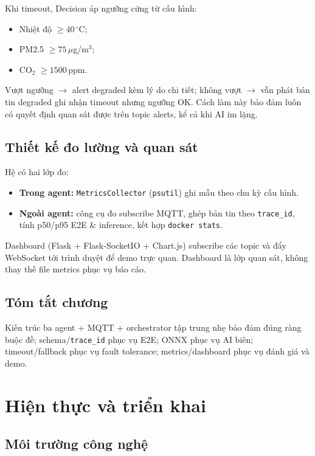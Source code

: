 \documentclass[12pt,a4paper,oneside]{report}
\newcommand{\code}[1]{\texttt{#1}}
\begin{document}
Khi timeout, Decision áp ngưỡng cứng từ cấu hình:
\begin{itemize}
  \item Nhiệt độ $\geq 40\,^\circ$C;
  \item PM2.5 $\geq 75\,\mu$g/m$^3$;
  \item CO$_2$ $\geq 1500$\,ppm.
\end{itemize}
Vượt ngưỡng $\rightarrow$ alert degraded kèm lý do chi tiết; không vượt $\rightarrow$ vẫn phát bản tin degraded ghi nhận timeout nhưng ngưỡng OK. Cách làm này bảo đảm luôn có quyết định quan sát được trên topic alerts, kể cả khi AI im lặng.

\section{Thiết kế đo lường và quan sát}

Hệ có hai lớp đo:
\begin{itemize}
  \item \textbf{Trong agent:} \code{MetricsCollector} (\code{psutil}) ghi mẫu theo chu kỳ cấu hình.
  \item \textbf{Ngoài agent:} công cụ đo subscribe MQTT, ghép bản tin theo \code{trace\_id}, tính p50/p95 E2E \& inference, kết hợp \code{docker stats}.
\end{itemize}
Dashboard (Flask + Flask-SocketIO + Chart.js) subscribe các topic và đẩy WebSocket tới trình duyệt để demo trực quan. Dashboard là lớp quan sát, không thay thế file metrics phục vụ báo cáo.

\section{Tóm tắt chương}

Kiến trúc ba agent + MQTT + orchestrator tập trung nhẹ bảo đảm đúng ràng buộc đề; schema/\code{trace\_id} phục vụ E2E; ONNX phục vụ AI biên; timeout/fallback phục vụ fault tolerance; metrics/dashboard phục vụ đánh giá và demo.

\chapter{Hiện thực và triển khai}

\section{Môi trường công nghệ}
\end{document}
